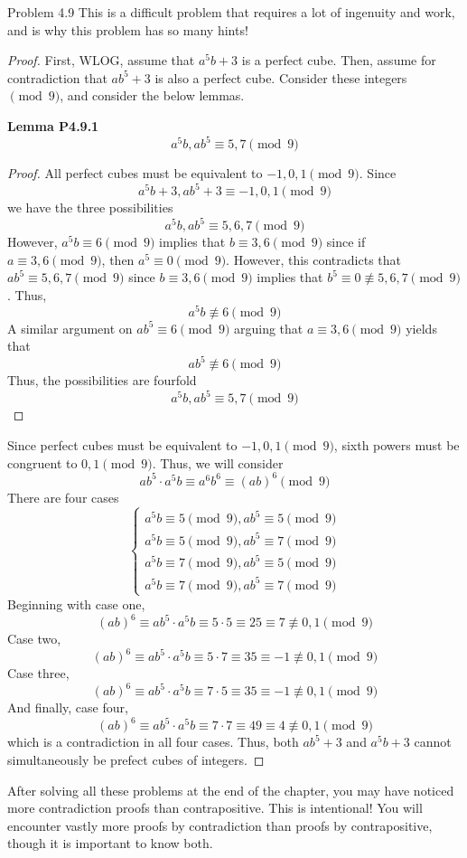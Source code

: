 \begin{sol}{Problem 4.9}
This is a difficult problem that requires a lot of ingenuity and work, and is why this problem has so many hints! 
\begin{proof}
First, WLOG, assume that $a^5b + 3$ is a perfect cube. Then, assume for contradiction that $ab^5+3$ is also a perfect cube. Consider these integers $\pmod{9}$, and consider the below lemmas. 

\textbf{Lemma P4.9.1}
\[
a^5b, ab^5 \equiv 5, 7 \pmod{9}
\]
\begin{proof}
All perfect cubes must be equivalent to $-1, 0, 1 \pmod{9}$. Since
\[
a^5b + 3, ab^5 + 3 \equiv -1, 0,1 \pmod{9}
\]
we have the three possibilities
\[
a^5b, ab^5 \equiv 5, 6, 7 \pmod{9}
\]
However, $a^5b \equiv 6 \pmod{9}$ implies that $b \equiv 3, 6 \pmod{9}$ since if $a \equiv 3, 6 \pmod{9}$, then $a^5 \equiv 0 \pmod{9}$. However, this contradicts that $ab^5 \equiv 5, 6, 7 \pmod{9}$ since $b \equiv 3, 6 \pmod{9}$ implies that $b^5 \equiv 0 \not\equiv 5, 6, 7 \pmod{9}$. Thus, 
\[a^5b \not\equiv 6 \pmod{9}\]
A similar argument on $ab^5 \equiv 6 \pmod{9}$ arguing that $a \equiv 3, 6 \pmod{9}$ yields that 
\[
ab^5 \not\equiv 6 \pmod{9}
\]
Thus, the possibilities are fourfold
\[
a^5b, ab^5 \equiv 5, 7 \pmod{9}
\]
\end{proof}

Since perfect cubes must be equivalent to $-1, 0, 1 \pmod{9}$, sixth powers must be congruent to $0, 1 \pmod{9}$. Thus, we will consider 
\[
ab^5 \cdot a^5b \equiv a^6b^6 \equiv (ab)^6 \pmod{9}
\]
There are four cases
\[
\begin{cases}
a^5b \equiv 5 \pmod{9}, ab^5 \equiv 5 \pmod{9} \\
a^5b \equiv 5 \pmod{9}, ab^5 \equiv 7 \pmod{9} \\
a^5b \equiv 7 \pmod{9}, ab^5 \equiv 5 \pmod{9} \\
a^5b \equiv 7 \pmod{9}, ab^5 \equiv 7 \pmod{9}
\end{cases}
\]
Beginning with case one, 
\[
(ab)^6 \equiv ab^5 \cdot a^5b \equiv 5 \cdot 5 \equiv 25 \equiv 7 \not\equiv 0, 1 \pmod{9}
\]
Case two,
\[
(ab)^6 \equiv ab^5 \cdot a^5b \equiv 5 \cdot 7 \equiv 35 \equiv -1 \not\equiv 0, 1 \pmod{9}
\]
Case three,
\[
(ab)^6 \equiv ab^5 \cdot a^5b \equiv 7 \cdot 5 \equiv 35 \equiv -1 \not\equiv 0, 1 \pmod{9}
\]
And finally, case four,
\[
(ab)^6 \equiv ab^5 \cdot a^5b \equiv 7 \cdot 7 \equiv 49 \equiv 4 \not\equiv 0, 1 \pmod{9}
\]
which is a contradiction in all four cases. Thus, both $ab^5 + 3$ and $a^5b + 3$ cannot simultaneously be prefect cubes of integers.
\end{proof}
After solving all these problems at the end of the chapter, you may have noticed more contradiction proofs than contrapositive. This is intentional! You will encounter vastly more proofs by contradiction than proofs by contrapositive, though it is important to know both. 
\end{sol}